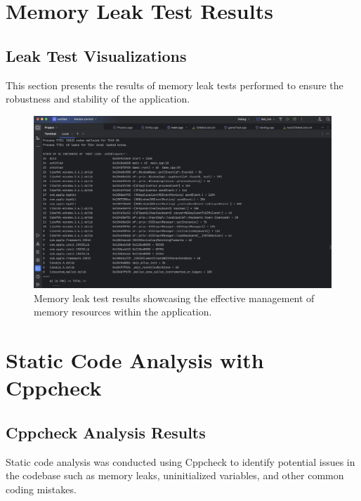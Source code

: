 \documentclass[12pt]{article}
\begin{document}
\section{Memory Leak Test Results}
\subsection{Leak Test Visualizations}
This section presents the results of memory leak tests performed to ensure the robustness and stability of the application.

\begin{figure}[h!]
    \centering
    \includegraphics[width=\linewidth]{leaks.png}
    \caption{Memory leak test results showcasing the effective management of memory resources within the application.}
    \label{fig:memory_leak_test}
\end{figure}
\FloatBarrier

\section{Static Code Analysis with Cppcheck}
\subsection{Cppcheck Analysis Results}
Static code analysis was conducted using Cppcheck to identify potential issues in the codebase such as memory leaks, uninitialized variables, and other common coding mistakes.
\end{document}
